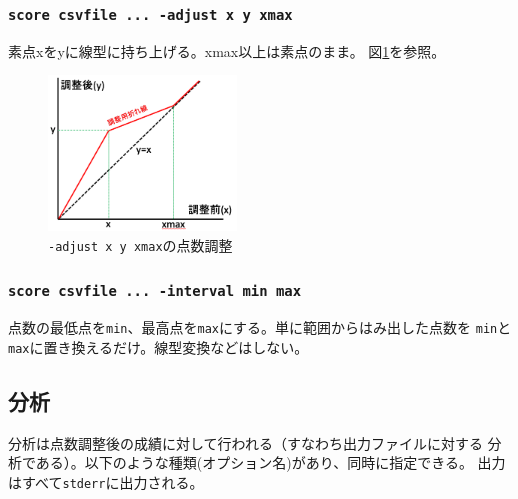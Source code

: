 \subsubsection{\texttt{score csvfile ... -adjust x y xmax}}
\label{scorecsvfile...-adjustxyxmax}

素点xをyに線型に持ち上げる。xmax以上は素点のまま。
図\ref{fig:adjust}を参照。

\begin{figure}[htbp]
\centering
\includegraphics[keepaspectratio,width=5cm,height=0.75\textheight]{fig/adjust.png}
\caption{\texttt{-adjust x y xmax}の点数調整}
\label{fig:adjust}
\end{figure}

\subsubsection{\texttt{score csvfile ... -interval min max}}
\label{scorecsvfile...-intervalminmax}

点数の最低点を\texttt{min}、最高点を\texttt{max}にする。単に範囲からはみ出した点数を
\texttt{min}と\texttt{max}に置き換えるだけ。線型変換などはしない。

\subsection{分析}
\label{分析}

分析は点数調整後の成績に対して行われる（すなわち出力ファイルに対する
分析である）。以下のような種類(オプション名)があり、同時に指定できる。
出力はすべて\texttt{stderr}に出力される。

